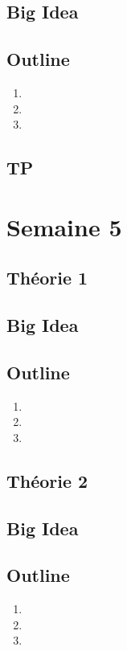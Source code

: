 \documentclass{article}
\begin{document}
\subsection*{Big Idea}
\subsection*{Outline}
\begin{enumerate}
    \item
    \item
    \item
\end{enumerate}
\subsection{TP}

\pagebreak
\section{Semaine 5}
\subsection{Théorie 1}
\subsection*{Big Idea}
\subsection*{Outline}
\begin{enumerate}
    \item
    \item
    \item
\end{enumerate}
\subsection{Théorie 2}
\subsection*{Big Idea}
\subsection*{Outline}
\begin{enumerate}
    \item
    \item
    \item
\end{enumerate}
\end{document}
